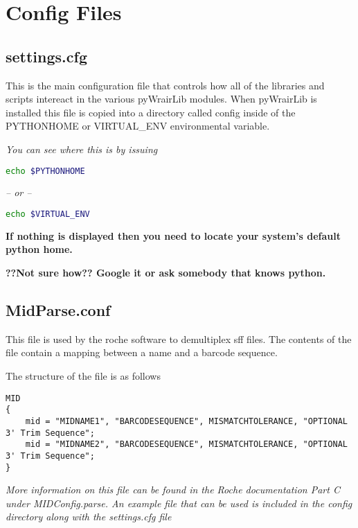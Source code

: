 \documentclass{article}
\begin{document}
\section{Config Files}

\subsection{settings.cfg}
This is the main configuration file that controls how all of the libraries and scripts intereact in the various pyWrairLib modules. When pyWrairLib is installed this file is copied into a directory called config inside of the PYTHONHOME or VIRTUAL\_ENV environmental variable.

\textit{You can see where this is by issuing}

\begin{lstlisting}[language=bash]
echo $PYTHONHOME
\end{lstlisting}

\textit{-- or --}

\begin{lstlisting}[language=bash]
echo $VIRTUAL_ENV
\end{lstlisting}

\textbf{If nothing is displayed then you need to locate your system's default python home.}

\textbf{??Not sure how?? Google it or ask somebody that knows python.}

\subsection{MidParse.conf}
This file is used by the roche software to demultiplex sff files. The contents of the file contain a mapping between a name and a barcode sequence.

The structure of the file is as follows
\begin{lstlisting}
MID
{
    mid = "MIDNAME1", "BARCODESEQUENCE", MISMATCHTOLERANCE, "OPTIONAL 3' Trim Sequence";
    mid = "MIDNAME2", "BARCODESEQUENCE", MISMATCHTOLERANCE, "OPTIONAL 3' Trim Sequence";
}
\end{lstlisting}

{\em More information on this file can be found in the Roche documentation Part C under MIDConfig.parse. An example file that can be used is included in the config directory along with the settings.cfg file}
\end{document}

